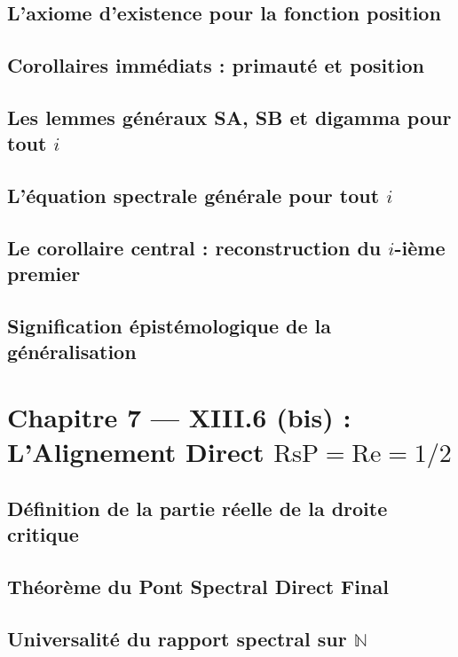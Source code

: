 \documentclass[11pt,a4paper]{article}
\begin{document}
\subsection{L'axiome d'existence pour la fonction position}
\label{hol:prime_position_exists}
\subsection{Corollaires immédiats : primauté et position}
\label{hol:primaute_position}
\subsection{Les lemmes généraux SA, SB et digamma pour tout $i$}
\label{hol:lemmes_i_general}
\subsection{L'équation spectrale générale pour tout $i$}
\label{hol:equation_spectrale_i}
\subsection{Le corollaire central : reconstruction du $i$-ième premier}
\label{hol:prime_equation_prime_i}
\subsection{Signification épistémologique de la généralisation}

\section{Chapitre 7 --- XIII.6 (bis) : L'Alignement Direct $\text{RsP} = \text{Re} = 1/2$}

\subsection{Définition de la partie réelle de la droite critique}
\subsection{Théorème du Pont Spectral Direct Final}
\label{hol:pont_direct_final}
\subsection{Universalité du rapport spectral sur $\mathbb{N}$}
\label{hol:universalite_rsp}
\end{document}
